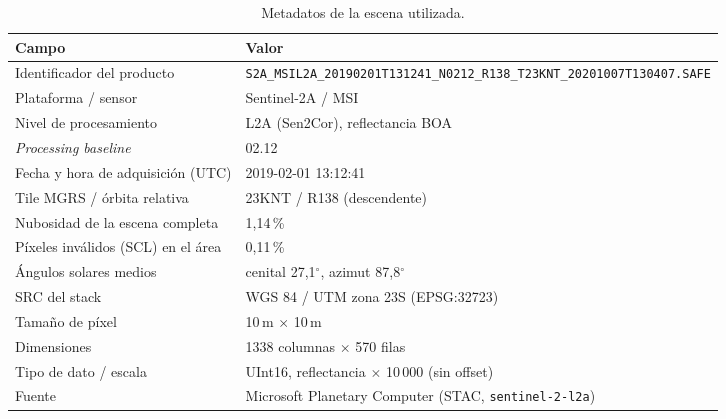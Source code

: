 \begin{table}[htbp]
 \centering
 \small
 \caption{Metadatos de la escena utilizada.}
 \label{tab:meta}
 \begin{tabularx}{\textwidth}{lX}
  \toprule
  Campo & Valor \\
  \midrule
  Identificador del producto & \texttt{S2A\_\allowbreak{}MSIL2A\_\allowbreak{}20190201T131241\_\allowbreak{}N0212\_\allowbreak{}R138\_\allowbreak{}T23KNT\_\allowbreak{}20201007T130407.SAFE} \\
  Plataforma / sensor & Sentinel-2A / MSI \\
  Nivel de procesamiento & L2A (Sen2Cor), reflectancia BOA \\
  \emph{Processing baseline} & 02.12 \\
  Fecha y hora de adquisición (UTC) & 2019-02-01 13:12:41 \\
  Tile MGRS / órbita relativa & 23KNT / R138 (descendente) \\
  Nubosidad de la escena completa & 1{,}14\,\% \\
  Píxeles inválidos (SCL) en el área & 0{,}11\,\% \\
  Ángulos solares medios & cenital 27{,}1$^\circ$, azimut 87{,}8$^\circ$ \\
  SRC del stack & WGS 84 / UTM zona 23S (EPSG:32723) \\
  Tamaño de píxel & 10\,m $\times$ 10\,m \\
  Dimensiones & 1338 columnas $\times$ 570 filas \\
  Tipo de dato / escala & UInt16, reflectancia $\times$ 10\,000 (sin offset) \\
  Fuente & Microsoft Planetary Computer (STAC, \texttt{sentinel-2-l2a}) \\
  \bottomrule
 \end{tabularx}
\end{table}

